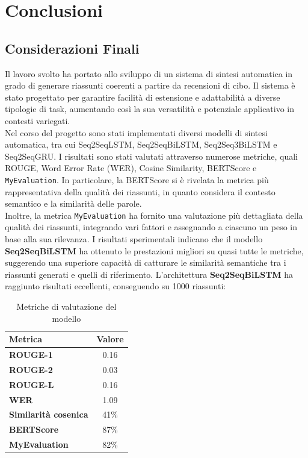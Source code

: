 \section{Conclusioni}
\subsection{Considerazioni Finali}
Il lavoro svolto ha portato allo sviluppo di un sistema di sintesi automatica in grado di generare riassunti coerenti a partire da recensioni di cibo. Il sistema è stato progettato per garantire facilità di estensione e adattabilità a diverse tipologie di task, aumentando così la sua versatilità e potenziale applicativo in contesti variegati.\\
Nel corso del progetto sono stati implementati diversi modelli di sintesi automatica, tra cui Seq2SeqLSTM, Seq2SeqBiLSTM, Seq2Seq3BiLSTM e Seq2SeqGRU.
I risultati sono stati valutati attraverso numerose metriche, quali ROUGE, Word Error Rate (WER), Cosine Similarity, BERTScore e \texttt{MyEvaluation}. In particolare,
la BERTScore si è rivelata la metrica più rappresentativa della qualità dei riassunti, in quanto considera il contesto semantico e la similarità delle parole.\\

Inoltre, la metrica \texttt{MyEvaluation} ha fornito una valutazione più dettagliata della qualità dei riassunti, integrando vari fattori e assegnando a ciascuno
un peso in base alla sua rilevanza. I risultati sperimentali indicano che il modello \textbf{Seq2SeqBiLSTM} ha ottenuto le prestazioni migliori su quasi tutte le metriche,
suggerendo una superiore capacità di catturare le similarità semantiche tra i riassunti generati e quelli di riferimento.
L'architettura \textbf{Seq2SeqBiLSTM} ha raggiunto risultati eccellenti, conseguendo su 1000 riassunti:
\begin{table}[ht]
    \centering
    \begin{tabular}{@{} >{\bfseries}l c @{}}
        \toprule
        \textbf{Metrica}    & \textbf{Valore} \\
        \midrule
        ROUGE-1             & 0.16            \\
        ROUGE-2             & 0.03            \\
        ROUGE-L             & 0.16            \\
        WER                 & 1.09            \\
        Similarità cosenica & 41\%            \\
        BERTScore           & 87\%            \\
        MyEvaluation        & 82\%            \\
        \bottomrule
    \end{tabular}
    \caption{Metriche di valutazione del modello}
\end{table}


